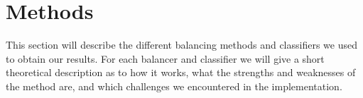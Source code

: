 \section{Methods}

This section will describe the different balancing methods and classifiers we used to obtain our results.
For each balancer and classifier we will give a short theoretical description as to how it works, what the strengths and weaknesses of the method are,
and which challenges we encountered in the implementation. 



